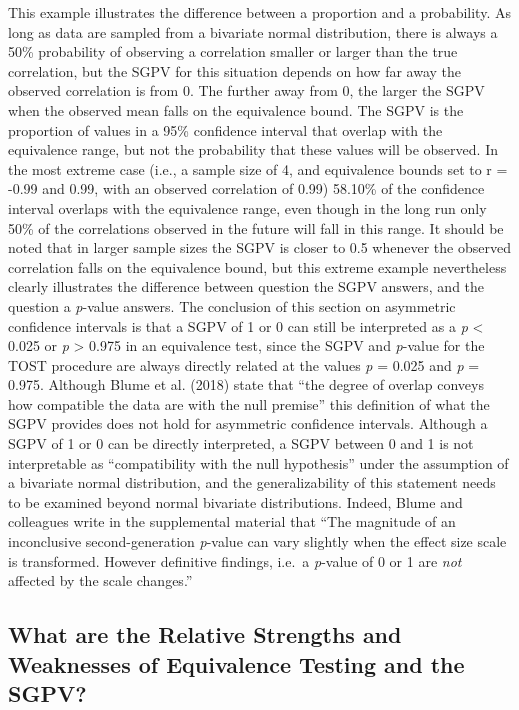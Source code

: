\documentclass[,man,floatsintext]{apa6}
\begin{document}
This example illustrates the difference between a proportion and a
probability. As long as data are sampled from a bivariate normal
distribution, there is always a 50\% probability of observing a
correlation smaller or larger than the true correlation, but the SGPV
for this situation depends on how far away the observed correlation is
from 0. The further away from 0, the larger the SGPV when the observed
mean falls on the equivalence bound. The SGPV is the proportion of
values in a 95\% confidence interval that overlap with the equivalence
range, but not the probability that these values will be observed. In
the most extreme case (i.e., a sample size of 4, and equivalence bounds
set to r = -0.99 and 0.99, with an observed correlation of 0.99) 58.10\%
of the confidence interval overlaps with the equivalence range, even
though in the long run only 50\% of the correlations observed in the
future will fall in this range. It should be noted that in larger sample
sizes the SGPV is closer to 0.5 whenever the observed correlation falls
on the equivalence bound, but this extreme example nevertheless clearly
illustrates the difference between question the SGPV answers, and the
question a \emph{p}-value answers. The conclusion of this section on
asymmetric confidence intervals is that a SGPV of 1 or 0 can still be
interpreted as a \emph{p} \textless{} 0.025 or \emph{p} \textgreater{}
0.975 in an equivalence test, since the SGPV and \emph{p}-value for the
TOST procedure are always directly related at the values \emph{p} =
0.025 and \emph{p} = 0.975. Although Blume et al. (2018) state that
\enquote{the degree of overlap conveys how compatible the data are with
the null premise} this definition of what the SGPV provides does not
hold for asymmetric confidence intervals. Although a SGPV of 1 or 0 can
be directly interpreted, a SGPV between 0 and 1 is not interpretable as
\enquote{compatibility with the null hypothesis} under the assumption of
a bivariate normal distribution, and the generalizability of this
statement needs to be examined beyond normal bivariate distributions.
Indeed, Blume and colleagues write in the supplemental material that
\enquote{The magnitude of an inconclusive second-generation
\emph{p}-value can vary slightly when the effect size scale is
transformed. However definitive findings, i.e.~a \emph{p}-value of 0 or
1 are \emph{not} affected by the scale changes.}

\subsection{What are the Relative Strengths and Weaknesses of
Equivalence Testing and the
SGPV?}\label{what-are-the-relative-strengths-and-weaknesses-of-equivalence-testing-and-the-sgpv}
\end{document}
